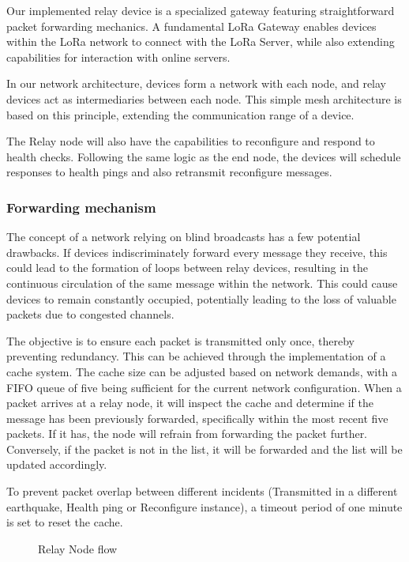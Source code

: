 Our implemented relay device is a specialized gateway featuring straightforward packet forwarding mechanics. A fundamental LoRa Gateway enables devices within the LoRa network to connect with the LoRa Server, while also extending capabilities for interaction with online servers. 

In our network architecture, devices form a network with each node, and relay devices act as intermediaries between each node. This simple mesh architecture is based on this principle, extending the communication range of a device.

The Relay node will also have the capabilities to reconfigure and respond to health checks. Following the same logic as the end node, the devices will schedule responses to health pings and also retransmit reconfigure messages.

\subsubsection{Forwarding mechanism}
The concept of a network relying on blind broadcasts has a few potential drawbacks. If devices indiscriminately forward every message they receive, this could lead to the formation of loops between relay devices, resulting in the continuous circulation of the same message within the network. This could cause devices to remain constantly occupied, potentially leading to the loss of valuable packets due to congested channels.

The objective is to ensure each packet is transmitted only once, thereby preventing redundancy. This can be achieved through the implementation of a cache system. The cache size can be adjusted based on network demands, with a FIFO queue of five being sufficient for the current network configuration. When a packet arrives at a relay node, it will inspect the cache and determine if the message has been previously forwarded, specifically within the most recent five packets. If it has, the node will refrain from forwarding the packet further. Conversely, if the packet is not in the list, it will be forwarded and the list will be updated accordingly.

To prevent packet overlap between different incidents (Transmitted in a different earthquake, Health ping or Reconfigure instance), a timeout period of one minute is set to reset the cache.

\begin{figure}[ht!]
    \centering
    
    \caption{Relay Node flow}
    \label{fig:relay flow}
\end{figure}


